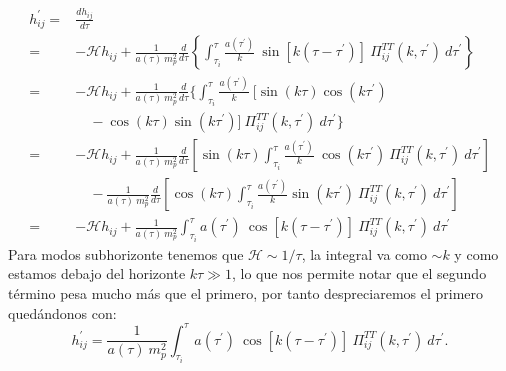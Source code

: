 \begin{equation*}
    \begin{split}
        h^\prime_{ij} =& \frac{dh_{ij}}{d\tau}\\
        =& -\mathcal{H} h_{ij} + \frac{1}{a(\tau) ~ m_p^2} \frac{d}{d\tau} \left\{ \int_{\tau_i}^{\tau} \frac{a \left( \tau^\prime \right)}{k} ~ \sin \left[ k \left( \tau - \tau^\prime \right) \right] ~ \Pi_{ij}^{TT} (k, \tau^\prime) ~ d\tau^\prime \right\}\\
        =& -\mathcal{H} h_{ij} + \frac{1}{a(\tau) ~ m_p^2} \frac{d}{d\tau} \Bigg\{ \int_{\tau_i}^{\tau} \frac{a \left( \tau^\prime \right)}{k} ~ \Big[ \sin (k \tau) \cos \left( k \tau^\prime \right) \\
        &\quad - \cos (k \tau) \sin \left( k \tau^\prime \right) \Big] ~ \Pi_{ij}^{TT} (k, \tau^\prime) ~ d\tau^\prime \Bigg\}\\
        =& -\mathcal{H} h_{ij} + \frac{1}{a(\tau) ~ m_p^2} \frac{d}{d\tau} \left[ \sin (k \tau) \int_{\tau_i}^{\tau} \frac{a \left( \tau^\prime \right)}{k} ~ \cos \left( k \tau^\prime \right) ~ \Pi^{TT}_{ij} \left( k, \tau^\prime \right) ~ d\tau^\prime \right]\\
        &\quad - \frac{1}{a(\tau) ~ m_p^2} \frac{d}{d\tau} \left[ \cos (k \tau) \int_{\tau_i}^\tau \frac{a \left( \tau^\prime \right)}{k} \sin \left( k \tau^\prime \right) ~ \Pi_{ij}^{TT} (k, \tau^\prime) ~ d\tau^\prime \right]\\
        =& -\mathcal{H} h_{ij} + \frac{1}{a(\tau) ~ m_p^2} \int_{\tau_i}^{\tau} a \left( \tau^\prime \right) ~ \cos \left[ k \left( \tau - \tau^\prime \right) \right] ~ \Pi^{TT}_{ij} \left( k, \tau^\prime \right) ~ d\tau^\prime
    \end{split}
\end{equation*}
Para modos subhorizonte tenemos que $\mathcal{H} \sim 1/\tau$, la integral va como $\sim k$ y como estamos debajo del horizonte $k\tau \gg 1$, lo que nos permite notar que el segundo término pesa mucho más que el primero, por tanto despreciaremos el primero quedándonos con:
\begin{equation}
    h^\prime_{ij} = \frac{1}{a(\tau) ~ m_p^2} \int_{\tau_i}^{\tau} a \left( \tau^\prime \right) ~ \cos \left[ k \left( \tau - \tau^\prime \right) \right] ~ \Pi^{TT}_{ij} \left( k, \tau^\prime \right) ~ d\tau^\prime.
\end{equation}

